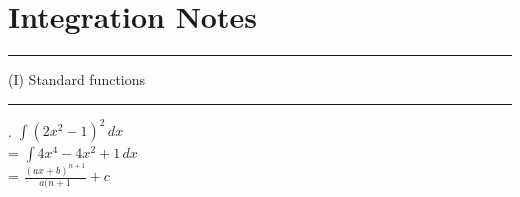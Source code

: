 \documentclass{article}
\begin{document}
\section{Integration Notes}

  \vspace{4pt}
    \hrule
  \vspace{4pt}
(I) Standard functions
\vspace{4pt}
    \hrule
  \vspace{4pt}

\hfill \break

\noindent{} 

\hfill \break

. \(\int (2x^2-1)^2 \,dx\) \\ = \(\int 4x^4 - 4x^2 + 1 \,dx\) \\ = \( \displaystyle \frac{(ax+b)^{n+1}}{a(n+1} + c\)
\end{document}
